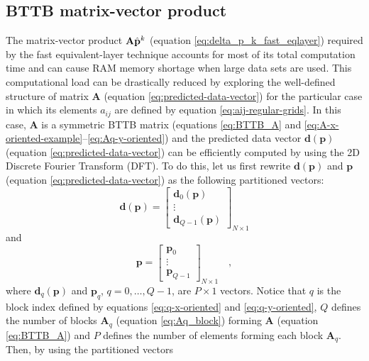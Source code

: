 \subsection{BTTB matrix-vector product}

The matrix-vector product $\tensor{A} \hat{\mathbf{p}}^{k}$ (equation 
\ref{eq:delta_p_k_fast_eqlayer}) required by the fast equivalent-layer 
technique \citep{siqueira-etal2017} accounts for most of its total computation time 
and can cause RAM memory shortage when large data sets are used.
This computational load can be drastically reduced by exploring the well-defined structure of 
matrix $\mathbf{A}$ (equation \ref{eq:predicted-data-vector}) for the particular case in which 
its elements $a_{ij}$ are defined by equation \ref{eq:aij-regular-grids}. 
In this case, $\mathbf{A}$ is a symmetric BTTB matrix (equations \ref{eq:BTTB_A} and 
\ref{eq:A-x-oriented-example}--\ref{eq:Aq-y-oriented}) and the predicted data vector 
$\mathbf{d}(\mathbf{p})$ (equation \ref{eq:predicted-data-vector}) can be efficiently
computed by using the 2D Discrete Fourier Transform (DFT).
To do this, let us first rewrite $\mathbf{d}(\mathbf{p})$ and
$\mathbf{p}$ (equation \ref{eq:predicted-data-vector}) as the following partitioned vectors:
\begin{equation}
\mathbf{d}(\mathbf{p}) = \begin{bmatrix}
\mathbf{d}_{0}(\mathbf{p}) \\
\vdots \\
\mathbf{d}_{Q - 1}(\mathbf{p})
\end{bmatrix}_{N \times 1}
\label{eq:predicted-data-vector-partitioned}
\end{equation}
and
\begin{equation}
\mathbf{p} = \begin{bmatrix}
\mathbf{p}_{0} \\
\vdots \\
\mathbf{p}_{Q - 1}
\end{bmatrix}_{N \times 1} \quad ,
\label{eq:parameter-vector-partitioned}
\end{equation}
where $\mathbf{d}_{q}(\mathbf{p})$ and $\mathbf{p}_{q}$, $q = 0, \dots, Q - 1$,
are $P \times 1$ vectors. Notice that $q$ is the block index defined by equations 
\ref{eq:q-x-oriented} and \ref{eq:q-y-oriented}, $Q$ defines the number of blocks
$\mathbf{A}_{q}$ (equation \ref{eq:Aq_block}) forming $\mathbf{A}$ (equation \ref{eq:BTTB_A}) 
and $P$ defines the number of elements forming each block $\mathbf{A}_{q}$.
Then, by using the partitioned vectors 
